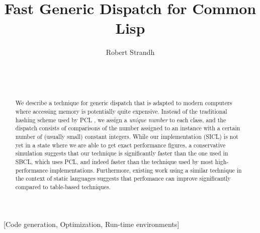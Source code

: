 \documentclass{acm_proc_article-sp}
\def\inputtex#1{}
\begin{document}
\title{Fast Generic Dispatch for Common Lisp}
\author{\alignauthor
Robert Strandh\\
\\
\\
\\
}


\maketitle

\begin{abstract}
We describe a technique for generic dispatch that is adapted to modern
computers where accessing memory is potentially quite expensive.
Instead of the traditional hashing scheme used by PCL
\cite{Kiczales:1990:EMD:91556.91600}, we assign a \emph{unique number}
to each class, and the dispatch consists of comparisons of the number
assigned to an instance with a certain number of (usually small)
constant integers.  While our implementation (SICL) is not yet in a
state where we are able to get exact performance figures, a
conservative simulation suggests that our technique is significantly
faster than the one used in SBCL, which uses PCL, and indeed faster
than the technique used by most high-performance \cl{}
implementations.  Furthermore, existing work
\cite{Zendra:1997:EDD:263698.263728} using a similar technique in the
context of static languages suggests that perfomance can improve
significantly compared to table-based techniques.
\end{abstract}

[Code generation, Optimization, Run-time environments]



\inputtex{sec-introduction.tex}
\inputtex{sec-previous.tex}
\inputtex{sec-our-method.tex}
\inputtex{sec-performance.tex}
\inputtex{sec-conclusions.tex}
\inputtex{sec-acknowledgements.tex}



\end{document}
